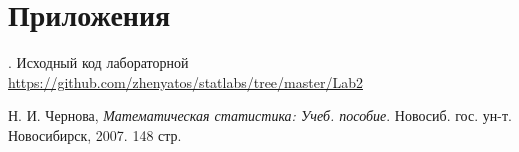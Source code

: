 \documentclass[12pt,a4paper]{article}
\begin{document}
\section{Приложения}
. Исходный код лабораторной {\url{https://github.com/zhenyatos/statlabs/tree/master/Lab2}}

\begin{thebibliography}{9} 
	 Н. И. Чернова, \emph{Математическая статистика: Учеб. пособие}. Новосиб. гос. ун-т. Новосибирск, 2007. 148 стр.
\end{thebibliography}
\end{document}
